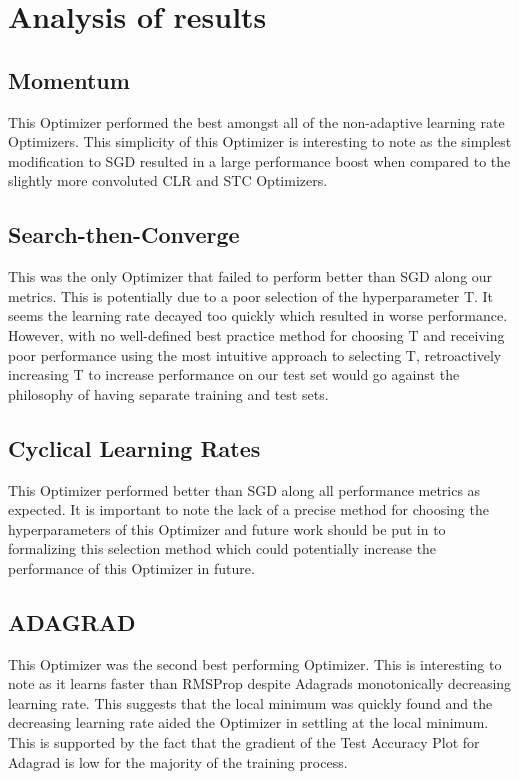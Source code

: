 \documentclass{article}
\begin{document}
\section{Analysis of results}
\subsection{Momentum}
This Optimizer performed the best amongst all of the non-adaptive learning rate Optimizers. This simplicity of this Optimizer is interesting to note as the simplest modification to SGD resulted in a large performance boost when compared to the slightly more convoluted CLR and STC Optimizers.

\subsection{Search-then-Converge} 
This was the only Optimizer that failed to perform better than SGD along our metrics. This is potentially due to a poor selection of the hyperparameter T. It seems the learning rate decayed too quickly which resulted in worse performance. However, with no well-defined best practice method for choosing T and receiving poor performance using the most intuitive approach to selecting T, retroactively increasing T to increase performance on our test set would go against the philosophy of having separate training and test sets.

\subsection{Cyclical Learning Rates}
This Optimizer performed better than SGD along all performance metrics as expected. It is important to note the lack of a precise method for choosing the hyperparameters of this Optimizer and future work should be put in to formalizing this selection method which could potentially increase the performance of this Optimizer in future.

\subsection{ADAGRAD}
This Optimizer was the second best performing Optimizer. This is interesting to note as it learns faster than RMSProp despite Adagrads monotonically decreasing learning rate. This suggests that the local minimum was quickly found and the decreasing learning rate aided the Optimizer in settling at the local minimum. This is supported by the fact that the gradient of the Test Accuracy Plot for Adagrad is low for the majority of the training process. 
\end{document}
